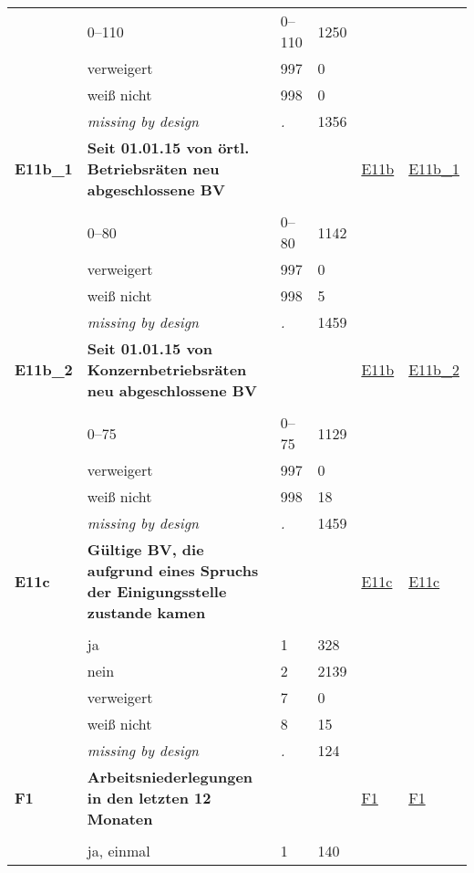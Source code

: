 \begin{longtable}{| L{2.45cm} | L{6cm} | C{1.5cm} | R{1cm} | C{2.25cm} | C{2.25cm} |}
   & 0--110 & 0--110 & 1250 &  &  \\ 
   & verweigert & 997 & 0 &  &  \\ 
   & weiß nicht & 998 & 0 &  &  \\ 
   & \textit{missing by design} & \textit{.} & 1356 &  &  \\ 
   \midrule
\textbf{E11b\_1}\label{var:E11b:1} & \textbf{Seit 01.01.15 von örtl. Betriebsräten neu abgeschlossene BV} &  &  & \hyperref[E11b]{E11b} & \hyperref[var:suf:E11b:1]{E11b\_1} \\ 
   &  &  &  &  &  \\ 
   & 0--80 & 0--80 & 1142 &  &  \\ 
   & verweigert & 997 & 0 &  &  \\ 
   & weiß nicht & 998 & 5 &  &  \\ 
   & \textit{missing by design} & \textit{.} & 1459 &  &  \\ 
   \midrule
\textbf{E11b\_2}\label{var:E11b:2} & \textbf{Seit 01.01.15 von Konzernbetriebsräten neu abgeschlossene BV} &  &  & \hyperref[E11b]{E11b} & \hyperref[var:suf:E11b:2]{E11b\_2} \\ 
   &  &  &  &  &  \\ 
   & 0--75 & 0--75 & 1129 &  &  \\ 
   & verweigert & 997 & 0 &  &  \\ 
   & weiß nicht & 998 & 18 &  &  \\ 
   & \textit{missing by design} & \textit{.} & 1459 &  &  \\ 
   \midrule
\textbf{E11c}\label{var:E11c} & \textbf{Gültige BV, die aufgrund eines Spruchs der Einigungsstelle zustande kamen} &  &  & \hyperref[E11c]{E11c} & \hyperref[var:suf:E11c]{E11c} \\ 
   &  &  &  &  &  \\ 
   & ja & 1 & 328 &  &  \\ 
   & nein & 2 & 2139 &  &  \\ 
   & verweigert & 7 & 0 &  &  \\ 
   & weiß nicht & 8 & 15 &  &  \\ 
   & \textit{missing by design} & \textit{.} & 124 &  &  \\ 
   \midrule
\textbf{F1}\label{var:F1} & \textbf{Arbeitsniederlegungen in den letzten 12 Monaten} &  &  & \hyperref[F1]{F1} & \hyperref[var:suf:F1]{F1} \\ 
   &  &  &  &  &  \\ 
   & ja, einmal & 1 & 140 &  &  \\ 

\end{longtable}
